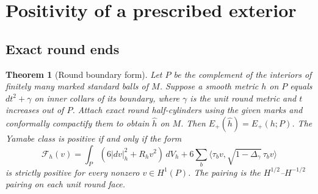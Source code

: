 \documentclass[11pt,letterpaper]{article}
\numberwithin{equation}{section}
\newtheorem{theorem}{Theorem}[section]
\theoremstyle{remark}
\begin{document}
\section{Positivity of a prescribed exterior}

\subsection{Exact round ends}

\begin{theorem}[Round boundary form]\label{thm:round-form}
Let \(P\) be the complement of the interiors of finitely many
marked standard balls of \(M\). Suppose a smooth metric \(h\)
on \(P\) equals \(dt^2+\gamma\) on inner collars of its boundary,
where \(\gamma\) is the unit round metric and \(t\) increases out
of \(P\). Attach exact round half-cylinders using the given marks
and conformally compactify them to obtain \(\widehat h\) on \(M\).
Then \(E_+(\widehat h)=E_+(h;P)\). The Yamabe class is positive
if and only if the form
\begin{equation}\label{eq:round-form}
 \mathcal F_h(v)=
 \int_P(6|dv|_h^2+R_hv^2)\,dV_h+
 6\sum_b\big\langle \tau_b v,\sqrt{1-\Delta_\gamma}\,\tau_b v\big\rangle
\end{equation}
is strictly positive for every nonzero \(v\in H^1(P)\). The pairing
is the \(H^{1/2}\)--\(H^{-1/2}\) pairing on each unit round face.
\end{theorem}
\end{document}
